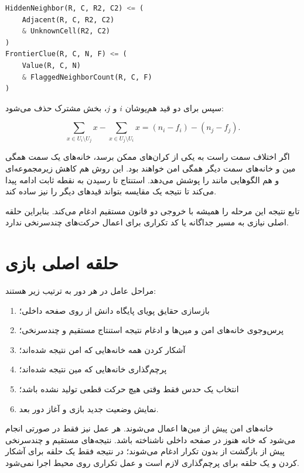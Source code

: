 \documentclass[10.5pt]{exam}
\begin{document}
\begin{latin}
    \begin{lstlisting}[language=Python]
HiddenNeighbor(R, C, R2, C2) <= (
    Adjacent(R, C, R2, C2)
    & UnknownCell(R2, C2)
)
FrontierClue(R, C, N, F) <= (
    Value(R, C, N)
    & FlaggedNeighborCount(R, C, F)
)
    \end{lstlisting}
\end{latin}

سپس برای دو قید هم‌پوشان $i$ و $j$، بخش مشترک حذف می‌شود:

\[
    \sum_{x\in U_i\setminus U_j}x-
    \sum_{x\in U_j\setminus U_i}x
    =(n_i-f_i)-(n_j-f_j).
\]

اگر اختلاف سمت راست به یکی از کران‌های ممکن برسد، خانه‌های یک سمت همگی مین و خانه‌های سمت دیگر همگی امن خواهند بود. این روش هم کاهش زیرمجموعه‌ای و هم الگوهایی مانند
را پوشش می‌دهد. استنتاج تا رسیدن به نقطه ثابت ادامه پیدا می‌کند تا نتیجه یک مقایسه بتواند قیدهای دیگر را نیز ساده کند.

تابع
نتیجه این مرحله را همیشه با خروجی دو قانون مستقیم ادغام می‌کند. بنابراین حلقه اصلی نیازی به مسیر جداگانه یا کد تکراری برای اعمال حرکت‌های چندسرنخی ندارد.

\section{حلقه اصلی بازی}
مراحل عامل در هر دور به ترتیب زیر هستند:

\begin{enumerate}
    \item بازسازی حقایق پویای پایگاه دانش از روی صفحه داخلی؛
    \item پرس‌وجوی خانه‌های امن و مین‌ها و ادغام نتیجه استنتاج مستقیم و چندسرنخی؛
    \item آشکار کردن همه خانه‌هایی که امن نتیجه شده‌اند؛
    \item پرچم‌گذاری خانه‌هایی که مین نتیجه شده‌اند؛
    \item انتخاب یک حدس فقط وقتی هیچ حرکت قطعی تولید نشده باشد؛
    \item نمایش وضعیت جدید بازی و آغاز دور بعد.
\end{enumerate}

خانه‌های امن پیش از مین‌ها اعمال می‌شوند. هر عمل نیز فقط در صورتی انجام می‌شود که خانه هنوز در صفحه داخلی ناشناخته باشد. نتیجه‌های مستقیم و چندسرنخی پیش از بازگشت از
بدون تکرار ادغام می‌شوند؛ در نتیجه فقط یک حلقه برای آشکار کردن و یک حلقه برای پرچم‌گذاری لازم است و عمل تکراری روی محیط اجرا نمی‌شود.
\end{document}
